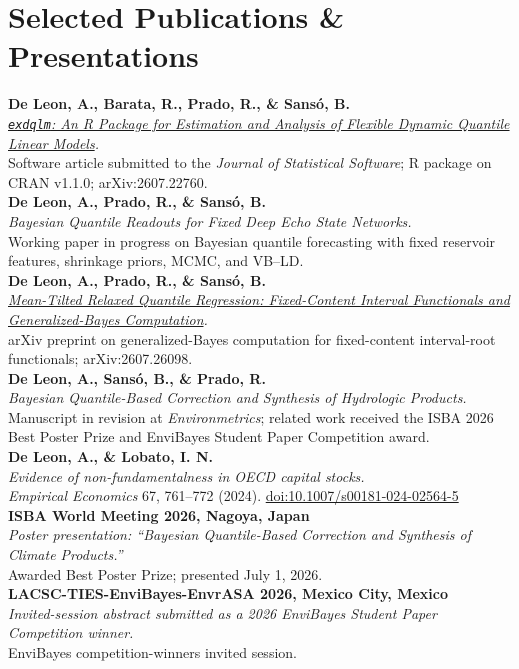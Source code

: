 \documentclass[10pt,letterpaper]{article}
\newcommand{\cvsection}[1]{%
  \Needspace{5\baselineskip}%
  \section*{#1}%
}
\newcommand{\pubentry}[3]{%
  \Needspace{4\baselineskip}%
  \textbf{#1}\\
  \textit{#2}\\
  #3\\[2pt]
}
\begin{document}
\cvsection{Selected Publications \& Presentations}
\pubentry{De Leon, A., Barata, R., Prado, R., \& Sans\'o, B.}{\href{https://arxiv.org/abs/2607.22760}{\texttt{exdqlm}: An R Package for Estimation and Analysis of Flexible Dynamic Quantile Linear Models}.}{Software article submitted to the \textit{Journal of Statistical Software}; R package on CRAN v1.1.0; arXiv:2607.22760.}

\pubentry{De Leon, A., Prado, R., \& Sans\'o, B.}{Bayesian Quantile Readouts for Fixed Deep Echo State Networks.}{Working paper in progress on Bayesian quantile forecasting with fixed reservoir features, shrinkage priors, MCMC, and VB--LD.}

\pubentry{De Leon, A., Prado, R., \& Sans\'o, B.}{\href{https://arxiv.org/abs/2607.26098}{Mean-Tilted Relaxed Quantile Regression: Fixed-Content Interval Functionals and Generalized-Bayes Computation}.}{arXiv preprint on generalized-Bayes computation for fixed-content interval-root functionals; arXiv:2607.26098.}

\pubentry{De Leon, A., Sans\'o, B., \& Prado, R.}{Bayesian Quantile-Based Correction and Synthesis of Hydrologic Products.}{Manuscript in revision at \textit{Environmetrics}; related work received the ISBA 2026 Best Poster Prize and EnviBayes Student Paper Competition award.}

\pubentry{De Leon, A., \& Lobato, I. N.}{Evidence of non-fundamentalness in OECD capital stocks.}{\textit{Empirical Economics} 67, 761--772 (2024). \href{https://doi.org/10.1007/s00181-024-02564-5}{doi:10.1007/s00181-024-02564-5}}

\pubentry{ISBA World Meeting 2026, Nagoya, Japan}{Poster presentation: ``Bayesian Quantile-Based Correction and Synthesis of Climate Products.''}{Awarded Best Poster Prize; presented July 1, 2026.}

\pubentry{LACSC-TIES-EnviBayes-EnvrASA 2026, Mexico City, Mexico}{Invited-session abstract submitted as a 2026 EnviBayes Student Paper Competition winner.}{EnviBayes competition-winners invited session.}
\end{document}
